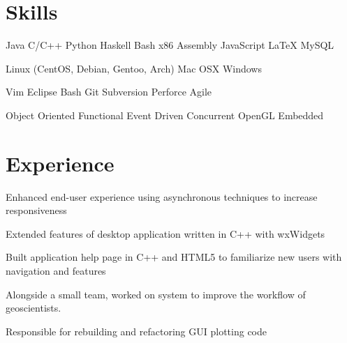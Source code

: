 \documentclass[letterpaper]{deedy-resume} %
\begin{document}
\begin{minipage}[t]{0.66\textwidth} %

%

\section{Skills}
Java \textbullet{} C/C++ \textbullet{} Python \textbullet{} Haskell \textbullet{} Bash \textbullet{} x86 Assembly \textbullet{} JavaScript \textbullet{} \LaTeX \textbullet{} MySQL
    
Linux (CentOS, Debian, Gentoo, Arch) \textbullet{} Mac OSX \textbullet{} Windows

Vim \textbullet{} Eclipse \textbullet{} Bash \textbullet{} Git \textbullet{} Subversion \textbullet{} Perforce \textbullet{} Agile

Object Oriented \textbullet{} Functional \textbullet{} Event Driven
\textbullet{} Concurrent \textbullet{} OpenGL \textbullet{} Embedded

\section{Experience}
\vspace{\topsep} %
\vspace{\topsep} %
\begin{tightitemize}
\item Enhanced end-user experience using asynchronous techniques to increase responsiveness
\item Extended features of desktop application written in C++ with wxWidgets
\item Built application help page in C++ and HTML5 to familiarize new users with navigation and features 
\end{tightitemize}

\sectionspace %

\vspace{\topsep} %
Alongside a small team, worked on system to improve the workflow of
geoscientists.
\vspace{\topsep} %
\vspace{\topsep} %
\begin{tightitemize}
\item Responsible for rebuilding and refactoring GUI plotting code
\end{tightitemize}


\end{minipage}
\end{document}
